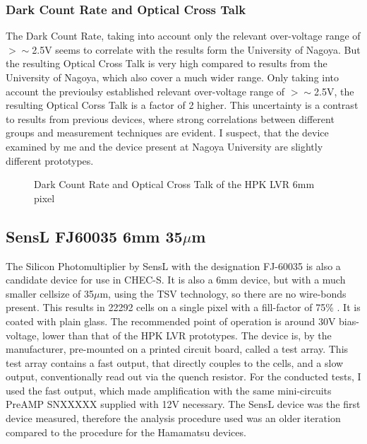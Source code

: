 \documentclass[12pt,article,type=msc,colorback,accentcolor=tud9c]{tudthesis}
\begin{document}
\subsubsection{Dark Count Rate and Optical Cross Talk}
\label{subsubsec:LVR6DCROCT}
The Dark Count Rate, taking into account only the relevant over-voltage range of $>\sim$2.5V seems to correlate with the results form the University of Nagoya. But the resulting Optical Cross Talk is very high compared to results from the University of Nagoya, which also cover a much wider range. Only taking into account the previoulsy established relevant over-voltage range of $>\sim$2.5V, the resulting Optical Corss Talk is a factor of 2 higher. This uncertainty is a contrast to results from previous devices, where strong correlations between different groups and measurement techniques are evident. I suspect, that the device examined by me and the device present at Nagoya University are slightly different prototypes.
\begin{figure}[h]
\begin{centering}
\caption{Dark Count Rate and Optical Cross Talk of the HPK LVR 6mm pixel}
\label{fig:LVR6_DCROCT}
\end{centering}
\end{figure}



\newpage
\subsection{SensL FJ60035 6mm 35$\mu$m}
The Silicon Photomultiplier by SensL with the designation FJ-60035 is also a candidate device for use in CHEC-S. It is also a 6mm device, but with a much smaller cellsize of 35$\mu$m, using the TSV technology, so there are no wire-bonds present. This results in 22292 cells on a single pixel with a fill-factor of 75\% . It is coated with plain glass. The recommended point of operation is around 30V bias-voltage, lower than that of the HPK LVR prototypes. The device is, by the manufacturer, pre-mounted on a printed circuit board, called a test array. This test array contains a fast output, that directly couples to the cells, and a slow output, conventionally read out via the quench resistor. For the conducted tests, I used the fast output, which made amplification with the same mini-circuits PreAMP SNXXXXX supplied with 12V necessary. The SensL device was the first device measured, therefore the analysis procedure used was an older iteration compared to the procedure for the Hamamatsu devices. 
\end{document}
